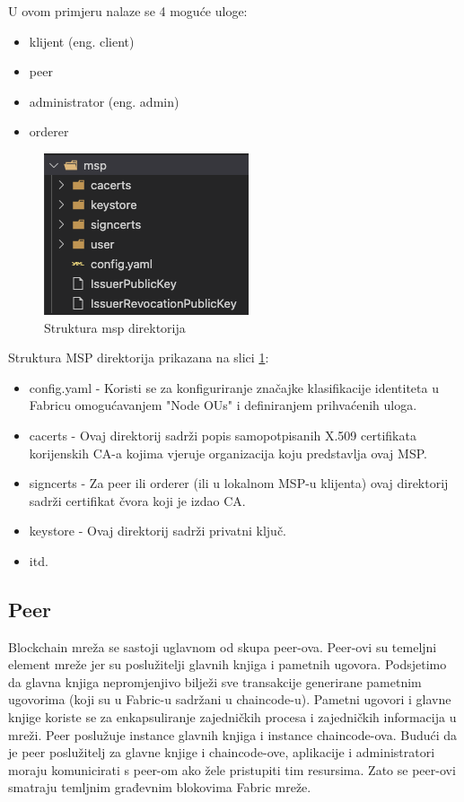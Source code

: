 \documentclass[times, utf8, diplomski]{fer}
\begin{document}
U ovom primjeru nalaze se 4 moguće uloge:
\begin{itemize}
\item klijent (eng. client)
\item peer
\item administrator (eng. admin)
\item orderer
\end{itemize}

\begin{figure}[htb]
\centering
\includegraphics{imgs/msp-folder.png}
\caption{Struktura msp direktorija}
\label{fig:msp}
\end{figure}

Struktura MSP direktorija prikazana na slici \ref{fig:msp}:

\begin{itemize}
\item config.yaml - Koristi se za konfiguriranje značajke klasifikacije identiteta u Fabricu omogućavanjem "Node OUs" i definiranjem prihvaćenih uloga.
\item cacerts - Ovaj direktorij sadrži popis samopotpisanih X.509 certifikata korijenskih CA-a kojima vjeruje organizacija koju predstavlja ovaj MSP.
\item signcerts - Za peer ili orderer (ili u lokalnom MSP-u klijenta) ovaj direktorij sadrži certifikat čvora koji je izdao CA.
\item keystore - Ovaj direktorij sadrži privatni ključ.
\item itd.
\end{itemize}

\subsection{Peer}
Blockchain mreža se sastoji uglavnom od skupa peer-ova. Peer-ovi su temeljni element mreže jer su poslužitelji glavnih knjiga i pametnih ugovora. Podsjetimo da glavna knjiga nepromjenjivo bilježi sve transakcije generirane pametnim ugovorima (koji su u Fabric-u sadržani u chaincode-u). Pametni ugovori i glavne knjige koriste se za enkapsuliranje zajedničkih procesa i zajedničkih informacija u mreži.
Peer poslužuje instance glavnih knjiga i instance chaincode-ova.
Budući da je peer poslužitelj za glavne knjige i chaincode-ove,  aplikacije i administratori moraju komunicirati s peer-om ako žele pristupiti tim resursima. Zato se peer-ovi smatraju temljnim građevnim blokovima Fabric mreže. 
\end{document}

